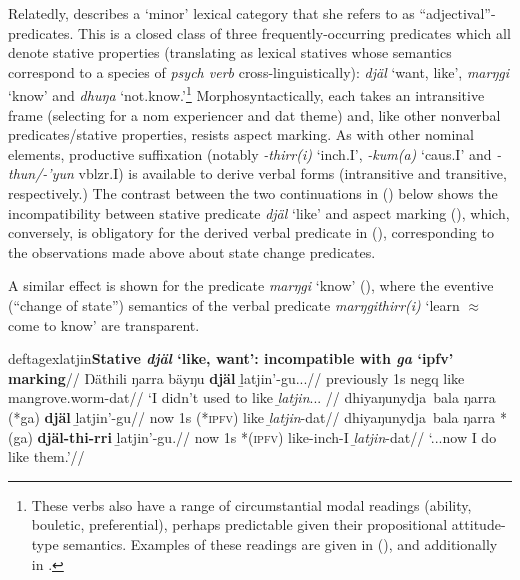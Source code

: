 Relatedly, \citet[557]{Wilkinson1991} describes a `minor' lexical category that she refers to as ``adjectival''-predicates. This is a closed class of three frequently-occurring predicates which all denote stative properties (translating as lexical statives whose semantics correspond to a species of \textit{psych verb} cross-linguistically): \textit{djäl} `want, like', \textit{marŋgi} `know' and \textit{dhuŋa} `not.know.'\footnote{These verbs also have a range of circumstantial modal readings (ability, bouletic, preferential), perhaps predictable given their propositional attitude-type semantics. Examples of these readings are given in (), and additionally in \citet[648]{Wilkinson1991}.} Morphosyntactically, each takes an intransitive frame (selecting for a \gls{nom} experiencer and \gls{dat} theme) and, like other nonverbal predicates/stative properties, resists aspect marking. As with other nominal elements, productive suffixation (notably \textit{-thirr(i)} `\gls{inch}.\gls{I}', \textit{-kum(a)} `\gls{caus}.\gls{I}' and \textit{-thun/-'yun} \gls{vblzr}.\gls{I}) is available to derive verbal forms (intransitive and transitive, respectively.) The contrast between the two continuations in () below shows the incompatibility between stative predicate \textit{djäl} `like' and aspect marking (), which, conversely, is obligatory for the derived verbal predicate in (), corresponding to the observations made above about state change predicates.

A similar effect is shown for the predicate \textit{marŋgi} `know' (), where the eventive (``change of state'') semantics of the verbal predicate \textit{marŋgithirr(i)} `learn $ \approx $ come to know' are transparent.


\pex\begingl\glpreamble deftagex{latjin}\textbf{Stative \textit{djäl} `like, want': incompatible with \textit{ga }`\gls{ipfv}' marking}//
\gla Ŋäthili ŋarra bäyŋu \textbf{djäl} ḻatjin'-gu...//
\glb previously 1s \gls{negq} like mangrove.worm-\gls{dat}//
\glft`I didn't used to like \emph{ḻatjin}... //\endgl
\a{}\begingl\gla {} dhiyaŋunydja~bala ŋarra (*ga) \textbf{djäl} ḻatjin'-gu//
\glb now 1s (*\textsc{ipfv}) like \textit{ḻatjin}-\gls{dat}//
\endgl
\a{}\begingl\gla {} dhiyaŋunydja~bala ŋarra *(ga) \textbf{djäl-thi-rri} ḻatjin'-gu.//
\glb now 1s *(\textsc{ipfv}) like-\gls{inch}-\gls{I} \textit{ḻatjin}-\gls{dat}//
\glft`...now I do like them.'\trailingcitation{[DhG~20190417]}//\endgl
\xe





